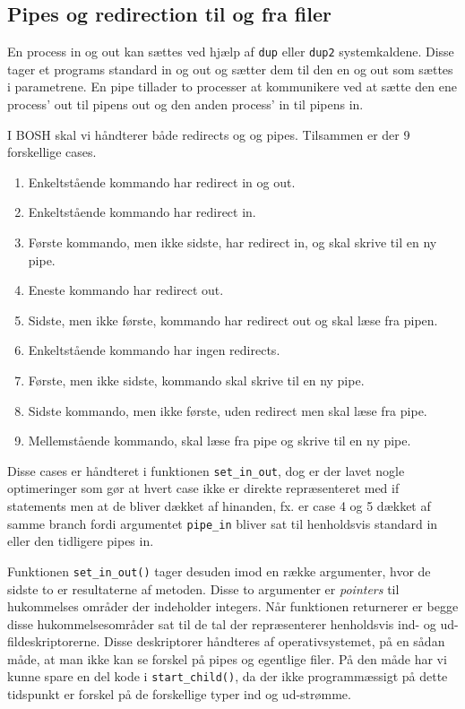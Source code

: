 \subsection{Pipes og redirection til og fra filer}
En process in og out kan sættes ved hjælp af \texttt{dup} eller \texttt{dup2} systemkaldene. Disse tager et programs standard in og out og sætter dem til den en og out som sættes i parametrene. En pipe tillader to processer at kommunikere ved at sætte den ene process' out til pipens out og den anden process' in til pipens in.

I BOSH skal vi håndterer både redirects og og pipes. Tilsammen er der 9 forskellige cases.
\begin{enumerate}
	\item Enkeltstående kommando har redirect in og out.
	\item Enkeltstående kommando har redirect in.
	\item Første kommando, men ikke sidste, har redirect in, og skal skrive til en ny pipe.
	\item Eneste kommando har redirect out.
	\item Sidste, men ikke første, kommando har redirect out og skal læse fra pipen.
	\item Enkeltstående kommando har ingen redirects.
	\item Første, men ikke sidste, kommando skal skrive til en ny pipe.
	\item Sidste kommando, men ikke første, uden redirect men skal læse fra pipe.
	\item Mellemstående kommando, skal læse fra pipe og skrive til en ny pipe.
\end{enumerate}

Disse cases er håndteret i funktionen \texttt{set\_in\_out}, dog er der lavet nogle optimeringer som gør at hvert case ikke er direkte repræsenteret med if statements men at de bliver dækket af hinanden, fx. er case 4 og 5 dækket af samme branch fordi argumentet \texttt{pipe\_in} bliver sat til henholdsvis standard in eller den tidligere pipes in.

Funktionen \texttt{set\_in\_out()} tager desuden imod en række argumenter, hvor de sidste to er resultaterne af metoden. Disse to argumenter er \textit{pointers} til hukommelses områder der indeholder integers. Når funktionen returnerer er begge disse hukommelsesområder sat til de tal der repræsenterer henholdsvis ind- og ud-fildeskriptorerne. Disse deskriptorer håndteres af operativsystemet, på en sådan måde, at man ikke kan se forskel på pipes og egentlige filer. På den måde har vi kunne spare en del kode i \texttt{start\_child()}, da der ikke programmæssigt på dette tidspunkt er forskel på de forskellige typer ind og ud-strømme.

